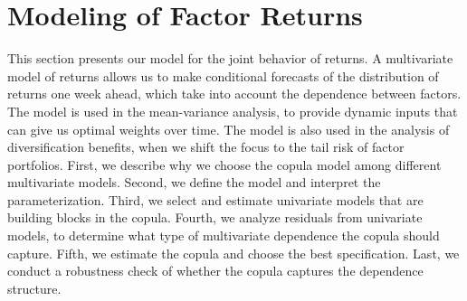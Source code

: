 
\section{Modeling of Factor Returns} %
\label{sec:modeling_of_factor_returns}

This section presents our model for the joint behavior of returns. A multivariate model of returns allows us to make conditional forecasts of the distribution of returns one week ahead, which take into account the dependence between factors. The model is used in the mean-variance analysis, to provide dynamic inputs that can give us optimal weights over time. The model is also used in the analysis of diversification benefits, when we shift the focus to the tail risk of factor portfolios. First, we describe why we choose the copula model among different multivariate models. Second, we define the model and interpret the parameterization. Third, we select and estimate univariate models that are building blocks in the copula. Fourth, we analyze residuals from univariate models, to determine what type of multivariate dependence the copula should capture. Fifth, we estimate the copula and choose the best specification. Last, we conduct a robustness check of whether the copula captures the dependence structure.








